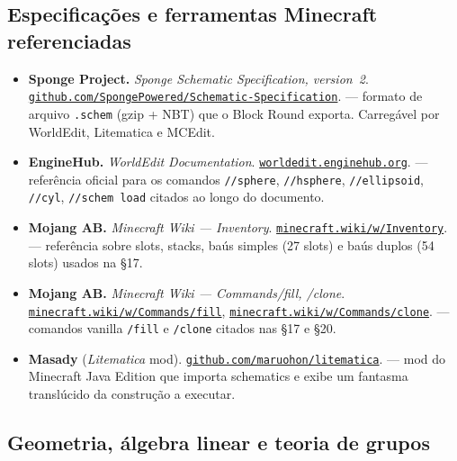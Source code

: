 \documentclass[12pt,a4paper]{scrartcl}
\newcommand{\code}[1]{\texttt{\small #1}}
\newcommand{\cmd}[1]{\textcolor{earth}{\texttt{\small #1}}}
\newcommand{\biblink}[2]{\href{#1}{\nolinkurl{#2}}}
\begin{document}
\subsection*{Especificações e ferramentas Minecraft referenciadas}

\begin{itemize}[leftmargin=1.4em,itemsep=0.3em,topsep=0.3em]
  \item \textbf{Sponge Project.} \emph{Sponge Schematic Specification, version~2}.
        \biblink{https://github.com/SpongePowered/Schematic-Specification}{github.com/SpongePowered/Schematic-Specification}.
        --- formato de arquivo \code{.schem} (gzip + NBT) que o Block Round exporta. Carregável por WorldEdit, Litematica e MCEdit.

  \item \textbf{EngineHub.} \emph{WorldEdit Documentation}.
        \biblink{https://worldedit.enginehub.org/}{worldedit.enginehub.org}.
        --- referência oficial para os comandos \cmd{//sphere}, \cmd{//hsphere}, \cmd{//ellipsoid}, \cmd{//cyl}, \cmd{//schem load} citados ao longo do documento.

  \item \textbf{Mojang AB.} \emph{Minecraft Wiki --- Inventory}.
        \biblink{https://minecraft.wiki/w/Inventory}{minecraft.wiki/w/Inventory}.
        --- referência sobre slots, stacks, baús simples (27 slots) e baús duplos (54 slots) usados na §17.

  \item \textbf{Mojang AB.} \emph{Minecraft Wiki --- Commands/fill, /clone}.
        \biblink{https://minecraft.wiki/w/Commands/fill}{minecraft.wiki/w/Commands/fill},
        \biblink{https://minecraft.wiki/w/Commands/clone}{minecraft.wiki/w/Commands/clone}.
        --- comandos vanilla \cmd{/fill} e \cmd{/clone} citados nas §17 e §20.

  \item \textbf{Masady} (\emph{Litematica} mod).
        \biblink{https://github.com/maruohon/litematica}{github.com/maruohon/litematica}.
        --- mod do Minecraft Java Edition que importa schematics e exibe um fantasma translúcido da construção a executar.
\end{itemize}

\subsection*{Geometria, álgebra linear e teoria de grupos}
\end{document}
